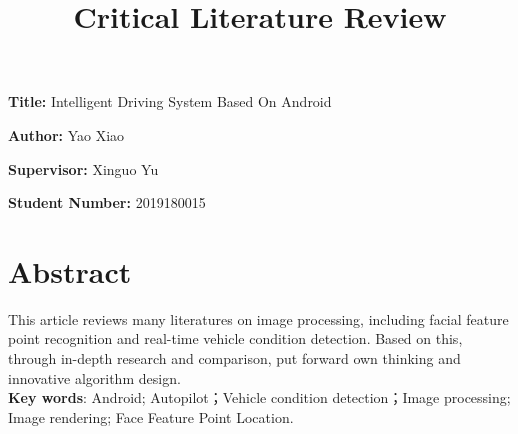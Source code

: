 \documentclass[12pt, a4paper]{article}
\title{Critical Literature Review}
\author{}
\date{}
\newcommand{\namelistlabel}[1]{\mbox{#1}\hfil}
\newenvironment{namelist}[1]{%

\begin{list}{}
    {
        \let\makelabel\namelistlabel
        \settowidth{\labelwidth}{#1}
        \setlength{\leftmargin}{1.1\labelwidth}
    }
  }{%
\end{list}}
\begin{document}
\maketitle

\begin{namelist}{xxxxxxxxxxxx}
\item[{\bf Title:}]
  Intelligent Driving System Based On Android
\item[{\bf Author:}]
  Yao Xiao	
\item[{\bf Supervisor:}]
  Xinguo Yu
\item[{\bf Student Number:}]
  2019180015
\end{namelist}

\section*{Abstract}
This article reviews many literatures on image processing, including facial feature point recognition and real-time vehicle condition detection. Based on this, through in-depth research and comparison, put forward own thinking and innovative algorithm design.\\
\textbf{Key words}: Android; Autopilot；Vehicle condition detection；Image processing; Image rendering; Face Feature Point Location.
\end{document}
